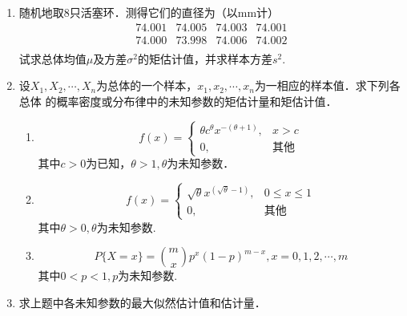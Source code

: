 \documentclass[10pt,a4paper]{article}
\begin{document}
\begin{enumerate}


    \item 随机地取8只活塞环．测得它们的直径为（以mm计）
    $$\begin{array}{cccc}
        74.001 & 74.005 & 74.003 & 74.001 \\
        74.000 & 73.998 & 74.006 & 74.002 \\
    \end{array}$$
    试求总体均值$\mu$及方差$\sigma^2$的矩估计值，并求样本方差$s^2$.



    \item 设$X_1,X_2,\cdots,X_n$为总体的一个样本，$x_1,x_2,\cdots,x_n$为一相应的样本值．求下列各总体
    的概率密度或分布律中的未知参数的矩估计量和矩估计值．
    \begin{enumerate}
        \item $$f(x)=\left\{\begin{array}{ll}
            \theta c^\theta x^{-(\theta+1)}, & x>c \\
            0, & \mbox{其他}
        \end{array}\right.$$
        其中$c>0$为已知，$\theta>1,\theta$为未知参数．
        \item $$f(x)=\left\{\begin{array}{ll}
            \sqrt{\theta}  x^{(\sqrt{\theta}-1)}, & 0\leq x\leq 1 \\
            0, & \mbox{其他}
        \end{array}\right.$$
        其中$\theta >0,\theta$为未知参数.
        \item $$P\{X=x\}=\binom{m}{x} p^x (1-p)^{m-x},x=0,1,2,\cdots,m$$其中$0<p<1,p$为未知参数. 
    \end{enumerate}



    \item 求上题中各未知参数的最大似然估计值和估计量．
    





\end{enumerate}
\end{document}

